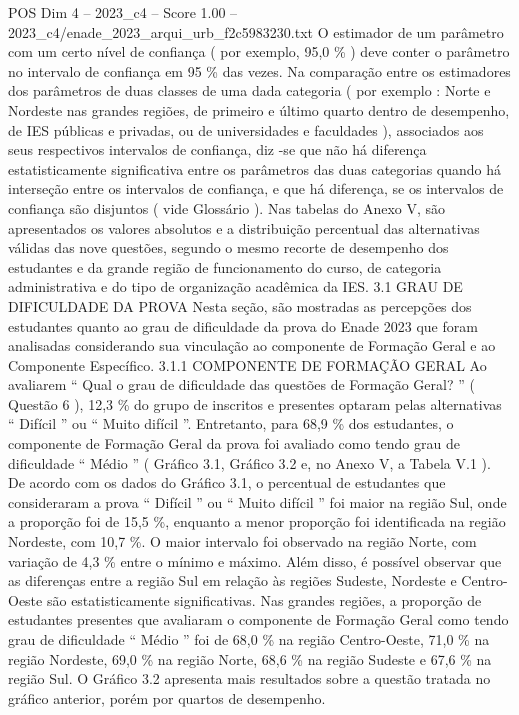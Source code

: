\begin{textsample}{POS Dim 4 – 2023\_c4 – Score 1.00 – 2023\_c4/enade\_2023\_arqui\_urb\_f2c5983230.txt}
O estimador de um parâmetro com um certo nível de confiança ( por exemplo, 95,0 \% ) deve conter o parâmetro no intervalo de confiança em 95 \% das vezes.
Na comparação entre os estimadores dos parâmetros de duas classes de uma dada categoria ( por exemplo : Norte e Nordeste nas grandes regiões, de primeiro e último quarto dentro de desempenho, de IES públicas e privadas, ou de universidades e faculdades ), associados aos seus respectivos intervalos de confiança, diz -se que não há diferença estatisticamente significativa entre os parâmetros das duas categorias quando há interseção entre os intervalos de confiança, e que há diferença, se os intervalos de confiança são disjuntos ( vide Glossário ).
Nas tabelas do Anexo V, são apresentados os valores absolutos e a distribuição percentual das alternativas válidas das nove questões, segundo o mesmo recorte de desempenho dos estudantes e da grande região de funcionamento do curso, de categoria administrativa e do tipo de organização acadêmica da IES. 3.1 GRAU DE DIFICULDADE DA PROVA Nesta seção, são mostradas as percepções dos estudantes quanto ao grau de dificuldade da prova do Enade 2023 que foram analisadas considerando sua vinculação ao componente de Formação Geral e ao Componente Específico. 3.1.1 COMPONENTE DE FORMAÇÃO GERAL Ao avaliarem “ Qual o grau de dificuldade das questões de Formação Geral? ” ( Questão 6 ), 12,3 \% do grupo de inscritos e presentes optaram pelas alternativas “ Difícil ” ou “ Muito difícil ”.
Entretanto, para 68,9 \% dos estudantes, o componente de Formação Geral da prova foi avaliado como tendo grau de dificuldade “ Médio ” ( Gráfico 3.1, Gráfico 3.2 e, no Anexo V, a Tabela V.1 ).
De acordo com os dados do Gráfico 3.1, o percentual de estudantes que consideraram a prova “ Difícil ” ou “ Muito difícil ” foi maior na região Sul, onde a proporção foi de 15,5 \%, enquanto a menor proporção foi identificada na região Nordeste, com 10,7 \%.
O maior intervalo foi observado na região Norte, com variação de 4,3 \% entre o mínimo e máximo.
Além disso, é possível observar que as diferenças entre a região Sul em relação às regiões Sudeste, Nordeste e Centro-Oeste são estatisticamente significativas.
Nas grandes regiões, a proporção de estudantes presentes que avaliaram o componente de Formação Geral como tendo grau de dificuldade “ Médio ” foi de 68,0 \% na região Centro-Oeste, 71,0 \% na região Nordeste, 69,0 \% na região Norte, 68,6 \% na região Sudeste e 67,6 \% na região Sul.
O Gráfico 3.2 apresenta mais resultados sobre a questão tratada no gráfico anterior, porém por quartos de desempenho.

\end{textsample}
